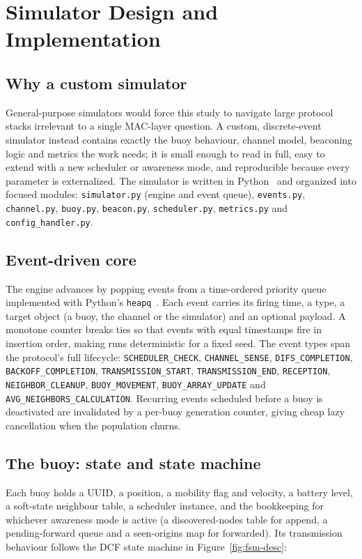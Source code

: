 \documentclass[12pt,a4paper,oneside]{report}
\begin{document}
\chapter{Simulator Design and Implementation}
\label{ch:simulator}

\section{Why a custom simulator}
General-purpose simulators would force this study to navigate large protocol
stacks irrelevant to a single MAC-layer question. A custom, discrete-event
simulator instead contains exactly the buoy behaviour, channel model, beaconing
logic and metrics the work needs; it is small enough to read in full, easy to
extend with a new scheduler or awareness mode, and reproducible because every
parameter is externalized. The simulator is written in Python~\cite{python} and
organized into focused modules: \texttt{simulator.py} (engine and event queue),
\texttt{events.py}, \texttt{channel.py}, \texttt{buoy.py}, \texttt{beacon.py},
\texttt{scheduler.py}, \texttt{metrics.py} and \texttt{config\_handler.py}.

\section{Event-driven core}
The engine advances by popping events from a time-ordered priority queue
implemented with Python's \texttt{heapq}~\cite{heapq}. Each event carries its
firing time, a type, a target object (a buoy, the channel or the simulator) and
an optional payload. A monotone counter breaks ties so that events with equal
timestamps fire in insertion order, making runs deterministic for a fixed seed.
The event types span the protocol's full lifecycle: \texttt{SCHEDULER\_CHECK},
\texttt{CHANNEL\_SENSE}, \texttt{DIFS\_COMPLETION}, \texttt{BACKOFF\_COMPLETION},
\texttt{TRANSMISSION\_START}, \texttt{TRANSMISSION\_END}, \texttt{RECEPTION},
\texttt{NEIGHBOR\_CLEANUP}, \texttt{BUOY\_MOVEMENT}, \texttt{BUOY\_ARRAY\_UPDATE}
and \texttt{AVG\_NEIGHBORS\_CALCULATION}. Recurring events scheduled before a
buoy is deactivated are invalidated by a per-buoy generation counter, giving
cheap lazy cancellation when the population churns.

\section{The buoy: state and state machine}
Each buoy holds a UUID, a position, a mobility flag and velocity, a battery
level, a soft-state neighbour table, a scheduler instance, and the bookkeeping
for whichever awareness mode is active (a discovered-nodes table for append, a
pending-forward queue and a seen-origins map for forwarded). Its transmission
behaviour follows the DCF state machine in Figure~\ref{fig:fsm-desc}:
\end{document}
